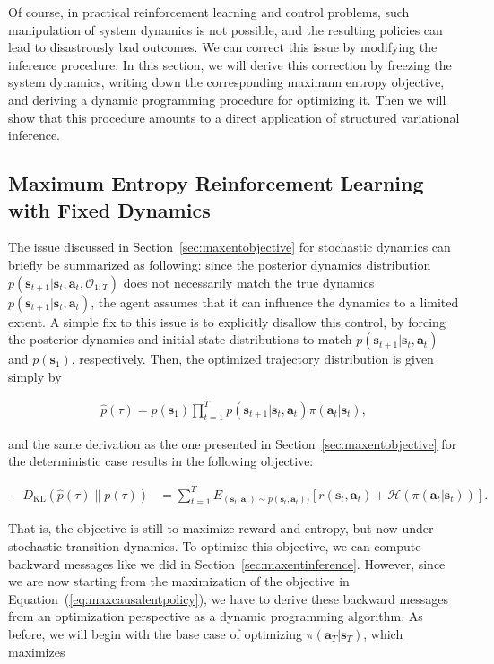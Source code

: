 Of course, in practical reinforcement learning and control problems, such manipulation of system dynamics is not possible, and the resulting policies can lead to disastrously bad outcomes. We can correct this issue by modifying the inference procedure. In this section, we will derive this correction by freezing the system dynamics, writing down the corresponding maximum entropy objective, and deriving a dynamic programming procedure for optimizing it. Then we will show that this procedure amounts to a direct application of structured variational inference.

\subsection{Maximum Entropy Reinforcement Learning with Fixed Dynamics}
\label{sec:fixeddynamics}

The issue discussed in Section~\ref{sec:maxentobjective} for stochastic dynamics can briefly be summarized as following: since the posterior dynamics distribution $p(\mathbf{s}_{t+1}|\mathbf{s}_t,\mathbf{a}_t, \mathcal{O}_{1:T})$ does not necessarily match the true dynamics $p(\mathbf{s}_{t+1}|\mathbf{s}_t,\mathbf{a}_t)$, the agent assumes that it can influence the dynamics to a limited extent. A simple fix to this issue is to explicitly disallow this control, by forcing the posterior dynamics and initial state distributions to match $p(\mathbf{s}_{t+1}|\mathbf{s}_t,\mathbf{a}_t)$ and $p(\mathbf{s}_1)$, respectively. Then, the optimized trajectory distribution is given simply by

\begin{align*}
\hat{p}(\tau) = p(\mathbf{s}_1) \prod_{t=1}^T p(\mathbf{s}_{t+1}|\mathbf{s}_t,\mathbf{a}_t) \pi(\mathbf{a}_t|\mathbf{s}_t),
\end{align*}

and the same derivation as the one presented in Section~\ref{sec:maxentobjective} for the deterministic case results in the following objective:

\begin{align}
-D_\text{KL}(\hat{p}(\tau) \| p(\tau)) &= \sum_{t=1}^T E_{(\mathbf{s}_t,\mathbf{a}_t) \sim \hat{p}(\mathbf{s}_t,\mathbf{a}_t))}[r(\mathbf{s}_t,\mathbf{a}_t) + \mathcal{H}(\pi(\mathbf{a}_t|\mathbf{s}_t))].\label{eq:maxcausalentpolicy}
\end{align}

That is, the objective is still to maximize reward and entropy, but now under stochastic transition dynamics. To optimize this objective, we can compute backward messages like we did in Section~\ref{sec:maxentinference}. However, since we are now starting from the maximization of the objective in Equation~(\ref{eq:maxcausalentpolicy}), we have to derive these backward messages from an optimization perspective as a dynamic programming algorithm. As before, we will begin with the base case of optimizing $\pi(\mathbf{a}_T|\mathbf{s}_T)$, which maximizes


